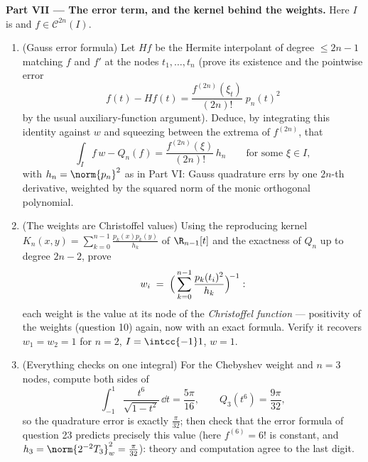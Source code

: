 \begin{problem}
\medskip
\noindent\textbf{Part VII --- The error term, and the kernel
behind the weights.} Here $I$ is  and $f \in \mathcal
C^{2n}(I)$.
\begin{enumerate}[resume]
  \item (Gauss error formula) Let $Hf$ be the Hermite
        interpolant of degree $\leq 2n - 1$ matching $f$ and
        $f'$ at the nodes $t_1, \dots, t_n$ (prove its
        existence and the pointwise error
        \[
        f(t) - Hf(t) =
        \frac{f^{(2n)}(\xi_t)}{(2n)!}\;p_n(t)^2
        \]
        by the usual auxiliary-function argument). Deduce, by
        integrating this identity against $w$ and squeezing
        between the extrema of $f^{(2n)}$, that
        \[
        \int_I f\,w - Q_n(f)
        = \frac{f^{(2n)}(\xi)}{(2n)!}\,h_n
        \qquad\text{for some } \xi \in I,
        \]
        with $h_n = \norm{p_n}^2$ as in Part VI: Gauss
        quadrature errs by one $2n$-th derivative, weighted by
        the squared norm of the monic orthogonal polynomial.
  \item (The weights are Christoffel values) Using the
        reproducing kernel $K_n(x, y) = \sum_{k=0}^{n-1}
        \frac{p_k(x)p_k(y)}{h_k}$ of $\R_{n-1}[t]$ and the
        exactness of $Q_n$ up to degree $2n - 2$, prove
        \[
        w_i \;=\;
        \Bigl(\,\sum_{k=0}^{n-1}
        \frac{p_k(t_i)^2}{h_k}\Bigr)^{\!-1} :
        \]
        each weight is the value at its node of the
        \emph{Christoffel function} --- positivity of the
        weights (question 10) again, now with an exact
        formula. Verify it recovers $w_1 = w_2 = 1$ for $n =
        2$, $I = \intcc{-1}1$, $w = 1$.
  \item (Everything checks on one integral) For the Chebyshev
        weight and $n = 3$ nodes, compute both sides of
        \[
        \int_{-1}^{1}\frac{t^6}{\sqrt{1 - t^2}}\,\dd t
        = \frac{5\pi}{16},
        \qquad
        Q_3(t^6) = \frac{9\pi}{32},
        \]
        so the quadrature error is exactly $\frac{\pi}{32}$;
        then check that the error formula of question 23
        predicts precisely this value (here $f^{(6)} = 6!$ is
        constant, and $h_3 = \norm{2^{-2}T_3}_w^2 =
        \frac\pi{32}$): theory and computation agree to the
        last digit.
\end{enumerate}
\end{problem}
